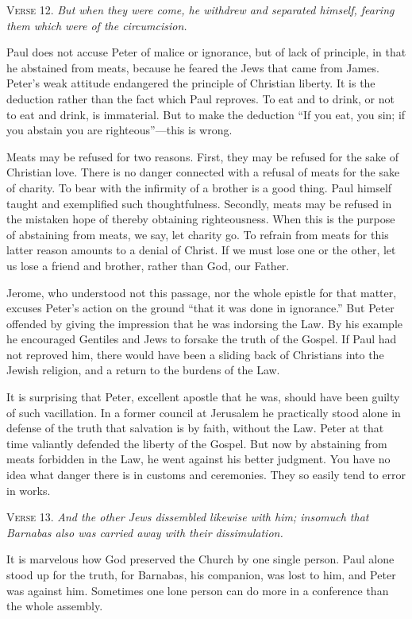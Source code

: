 \textsc{Verse} 12. \emph{But when they were come, he withdrew and separated himself, fearing them which were of the circumcision.}

Paul does not accuse Peter of malice or ignorance, but of lack of principle, in that he abstained from meats, because he feared the Jews that came from James. Peter’s weak attitude endangered the principle of Christian liberty. It is the deduction rather than the fact which Paul reproves. To eat and to drink, or not to eat and drink, is immaterial. But to make the deduction “If you eat, you sin; if you abstain you are righteous”—this is wrong.

Meats may be refused for two reasons. First, they may be refused for the sake of Christian love. There is no danger connected with a refusal of meats for the sake of charity. To bear with the infirmity of a brother is a good thing. Paul himself taught and exemplified such thoughtfulness. Secondly, meats may be refused in the mistaken hope of thereby obtaining righteousness. When this is the purpose of abstaining from meats, we say, let charity go. To refrain from meats for this latter reason amounts to a denial of Christ. If we must lose one or the other, let us lose a friend and brother, rather than God, our Father.

Jerome, who understood not this passage, nor the whole epistle for that matter, excuses Peter’s action on the ground “that it was done in ignorance.” But Peter offended by giving the impression that he was indorsing the Law. By his example he encouraged Gentiles and Jews to forsake the truth of the Gospel. If Paul had not reproved him, there would have been a sliding back of Christians into the Jewish religion, and a return to the burdens of the Law.

It is surprising that Peter, excellent apostle that he was, should have been guilty of such vacillation. In a former council at Jerusalem he practically stood alone in defense of the truth that salvation is by faith, without the Law. Peter at that time valiantly defended the liberty of the Gospel. But now by abstaining from meats forbidden in the Law, he went against his better judgment. You have no idea what danger there is in customs and ceremonies. They so easily tend to error in works.

\textsc{Verse} 13. \emph{And the other Jews dissembled likewise with him; insomuch that Barnabas also was carried away with their dissimulation.}

It is marvelous how God preserved the Church by one single person. Paul alone stood up for the truth, for Barnabas, his companion, was lost to him, and Peter was against him. Sometimes one lone person can do more in a conference than the whole assembly.

